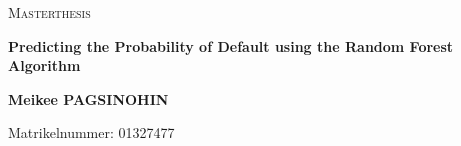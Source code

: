\documentclass[12pt,twoside=false,headheight=-10pt, bibliography=numbered, egregdoesnotlikesansseriftitles]{scrreprt} %
\newcommand*{\listofappendices}{\listoftoc{loa}}
\begin{document}

\renewcommand{\thepage}{\Roman{page}}

\begin{titlepage}
	\centering
	\vspace{1cm}
	{\scshape\LARGE Masterthesis \par}
	\vspace{1cm}
	{\scshape\Large \par}
	\vspace{1.5cm}
	{\huge\bfseries Predicting the Probability of Default using the Random Forest Algorithm \par}
	\vspace{2cm}
	\vspace{2cm}
	\vspace{2cm}
	{\Large\bfseries Meikee PAGSINOHIN \par}	
	\vfill
	{\Large Matrikelnummer: 01327477 \par}

	\vfill

\end{titlepage}


\pagestyle{scrheadings} 

\begin{singlespace}

\tableofcontents

\listofappendices
\newpage

\listoffigures
\newpage

\listoftables
\newpage

\printacronyms
\newpage

\end{singlespace}
\end{document}
